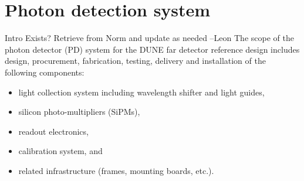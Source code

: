 





\section{Photon detection system}

Intro  Exists?  Retrieve from Norm and update as needed --Leon
The scope of the photon detector (PD) system for the DUNE far detector
reference design includes design, procurement, fabrication,
testing, delivery and installation of the following components:
\begin{itemize}
\item light collection system including wavelength shifter and light guides,
\item silicon photo-multipliers (SiPMs),
\item readout electronics,
\item calibration system, and
\item related infrastructure (frames, mounting boards, etc.).
\end{itemize}

